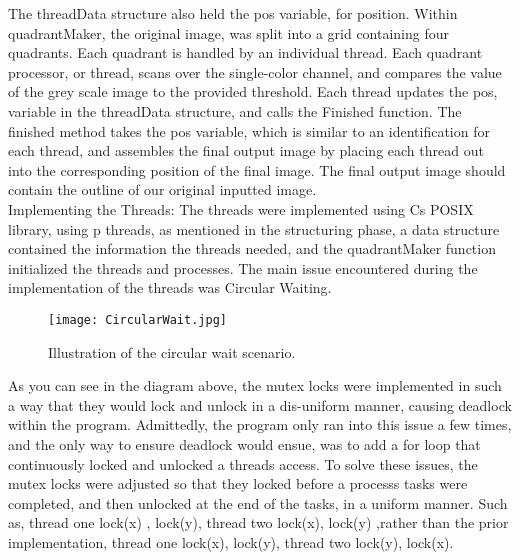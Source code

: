 \documentclass{article}
\begin{document}
The threadData structure also held the pos variable, for position. Within quadrantMaker, the original 
image, was split into a grid containing four quadrants. Each quadrant is handled by an individual thread. 
Each quadrant processor, or thread, scans over the single-color channel, and compares the value of the grey 
scale image to the provided threshold. Each thread updates the pos, variable in the threadData structure, and
 calls the Finished function. The finished method takes the pos variable, which is similar to an 
 identification for each thread, and assembles the final output image by placing each thread out into the 
 corresponding position of the final image. The final output image should contain the outline of our original
  inputted image. \vspace{.5cm}\\

Implementing the Threads: The threads were implemented using Cs POSIX library, using p threads, 
as mentioned in the structuring phase, a data structure contained the information the threads needed,
 and the quadrantMaker function initialized the threads and processes. The main issue encountered during 
 the implementation of the threads was Circular Waiting.\vspace{.5cm}\\
\begin{figure}[htbp]
    \centering
    \texttt{[image: CircularWait.jpg]}
    \caption{Illustration of the circular wait scenario.}
    \label{fig:circular_wait}
\end{figure}
As you can see in the diagram above, the mutex locks were implemented in such a way that they would lock and unlock in a dis-uniform manner, causing deadlock within the program. Admittedly, the program only ran into this issue a few times, and the only way to ensure deadlock would ensue, was to add a for loop that continuously locked and unlocked a threads access. To solve these issues, the mutex locks were adjusted so that they locked before a processs tasks were completed, and then unlocked at the end of the tasks, in a uniform manner. Such as, {thread one} lock(x) , lock(y), {thread two} lock(x), lock(y) ,rather than the prior implementation, {thread one} lock(x), lock(y), {thread two} lock(y), lock(x).\vspace{.5cm}\\
\end{document}
